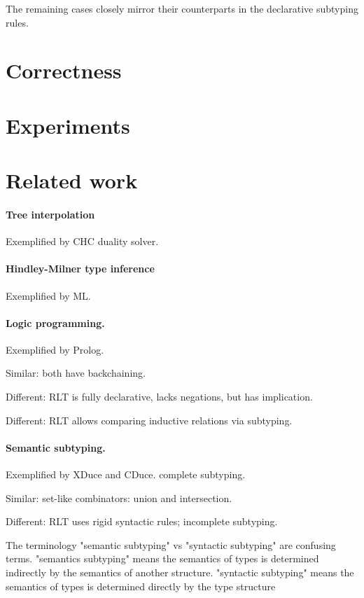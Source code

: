 \documentclass[acmsmall]{acmart}
\theoremstyle{definition}
\begin{document}
The remaining cases closely mirror their counterparts in the declarative subtyping rules.


\section{Correctness}


\section{Experiments}


\section{Related work}


\paragraph{Tree interpolation}
Exemplified by CHC duality solver.

\paragraph{Hindley-Milner type inference}
Exemplified by ML.

\paragraph{Logic programming.}
Exemplified by Prolog. 


Similar: both have backchaining. 

Different: RLT is fully declarative, lacks negations, but has implication. 

Different: RLT allows comparing inductive relations via subtyping. 

\paragraph{Semantic subtyping.} 
Exemplified by XDuce and CDuce. complete subtyping.

Similar: set-like combinators: union and intersection.

Different: RLT uses rigid syntactic rules; incomplete subtyping.

The terminology "semantic subtyping" vs "syntactic subtyping" are confusing terms. 
"semantics subtyping" means the semantics of types is determined indirectly by the semantics of another structure.
"syntactic subtyping" means the semantics of types is determined directly by the type structure
\end{document}
